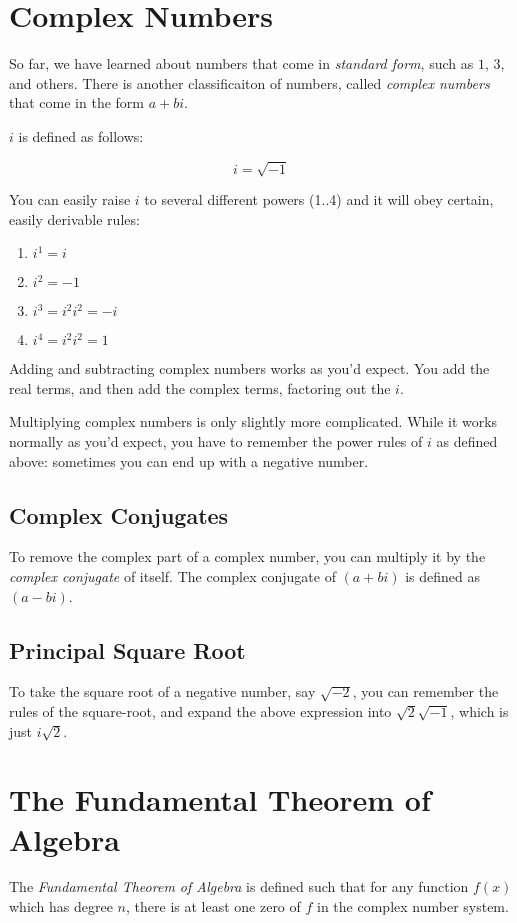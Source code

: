 \section{Complex Numbers}
So far, we have learned about numbers that come in \textit{standard form}, such
as $1$, $3$, and others.  There is another classificaiton of numbers, called
\textit{complex numbers} that come in the form $a+bi$.

$i$ is defined as follows:

\begin{equation}
  i=\sqrt{-1}
\end{equation}

You can easily raise $i$ to several different powers (1..4) and it will obey
certain, easily derivable rules:

\begin{enumerate}
  \item{$i^1=i$}
  \item{$i^2=-1$}
  \item{$i^3=i^2i^2=-i$}
  \item{$i^4=i^2i^2=1$}
\end{enumerate}

Adding and subtracting complex numbers works as you'd expect. You add the real
terms, and then add the complex terms, factoring out the $i$.

Multiplying complex numbers is only slightly more complicated.  While it works
normally as you'd expect, you have to remember the power rules of $i$ as defined
above: sometimes you can end up with a negative number.

\subsection{Complex Conjugates}
To remove the complex part of a complex number, you can multiply it by the
\textit{complex conjugate} of itself.  The complex conjugate of $(a+bi)$ is
defined as $(a-bi)$.

\subsection{Principal Square Root}
To take the square root of a negative number, say $\sqrt{-2}$, you can remember
the rules of the square-root, and expand the above expression into
$\sqrt{2}\sqrt{-1}$, which is just $i\sqrt{2}$.

\section{The Fundamental Theorem of Algebra}
The \textit{Fundamental Theorem of Algebra} is defined such that for any
function $f(x)$ which has degree $n$, there is at least one zero of $f$ in the
complex number system.

